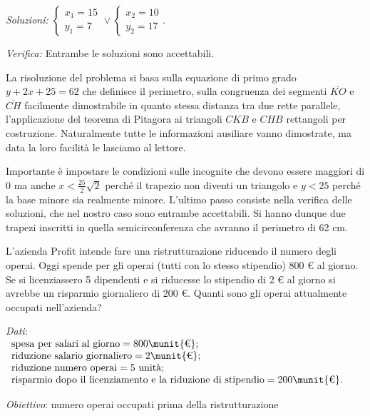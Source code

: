 \emph{Soluzioni: } \(\left\{\begin{array}{l}{x_1=15}\\{y_1=7}\end{array}\right.\vee \left\{\begin{array}{l}{x_2=10}\\{y_2=17}\end{array}\right.\).

\emph{Verifica: }Entrambe le soluzioni sono accettabili.

La risoluzione del problema si basa sulla equazione di primo grado \(y+2x+25=62\) che definisce il perimetro, sulla congruenza dei segmenti \(\overline{{KO}}\) e \(\overline{{CH}}\) facilmente dimostrabile in quanto stessa distanza tra due rette parallele, l'applicazione del teorema di Pitagora ai triangoli \({CKB}\) e \({CHB}\) rettangoli per costruzione. Naturalmente tutte le informazioni ausiliare vanno dimostrate, ma data la loro facilità le lasciamo al lettore.

Importante è impostare le condizioni sulle incognite che devono essere maggiori di \(0\) ma anche \(x<\frac{25} 2\sqrt 2\) perché il trapezio non diventi un triangolo e \(y<25\) perché la base minore sia realmente minore. L'ultimo passo consiste nella verifica delle soluzioni, che nel nostro caso sono entrambe accettabili. Si hanno dunque due trapezi inscritti in quella semicirconferenza che avranno il perimetro di 62 cm.

\begin{problema}{}{}
L'azienda Profit intende fare una ristrutturazione riducendo il numero degli operai. Oggi spende per gli operai (tutti con lo stesso stipendio) 800 € al giorno. Se si licenziassero 5 dipendenti e si riducesse lo stipendio di 2 € al giorno si avrebbe un risparmio giornaliero di 200 €. Quanti sono gli operai attualmente occupati nell'azienda?
\end{problema}

\emph{Dati}:\( \begin{array}{l}
\text{spesa per salari al giorno}= 800\munit{\text{€}};\\
\text{riduzione salario giornaliero}= 2\munit{\text{€}};\\
\text{riduzione numero operai}= 5\text{ unità};\\
\text{risparmio dopo il licenziamento e la riduzione di stipendio}= 200\munit{\text{€}}.
\end{array}\)

\emph{Obiettivo}: numero operai occupati prima della ristrutturazione

